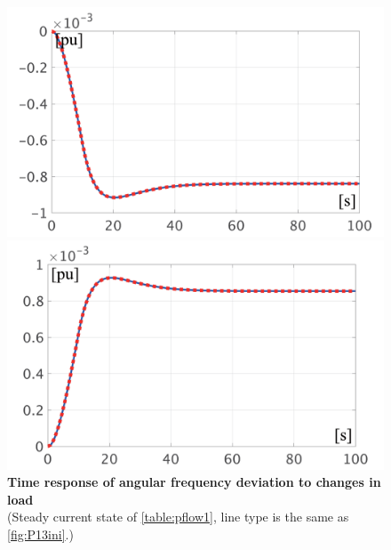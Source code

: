 \documentclass[tombow,dvipdfmx]{corona-a5-1.1}
\begin{document}
\begin{figure}[t]
  \centering
  {
  \begin{minipage}{0.49\linewidth}
    \centering
    \includegraphics[width = 1.0\linewidth]{figs/P1mi}
  \end{minipage}
  \begin{minipage}{0.49\linewidth}
    \centering
    \includegraphics[width = 1.0\linewidth]{figs/P1pl}
  \end{minipage}
  \medskip
  \caption{\textbf{Time response of angular frequency deviation to changes in load}
  \\ \centering(Steady current state of \ref{table:pflow1}, line type is the same as \ref{fig:P13ini}.)}
  \label{fig:P1load}
  }
\medskip
\end{figure}
\end{document}
